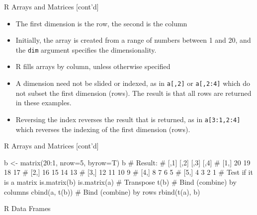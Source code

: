 \documentclass[ignorenonframetext,xcolor=x11names]{beamer}
\begin{document}
\begin{frame}[label=full]{R Arrays and Matrices \small [cont'd]}
\begin{itemize}
   \item The first dimension is the row, the second is the column
   \item Initially, the array is created from a range of numbers between 1 and 20, and the \texttt{dim} argument specifies the dimensionality. 
   \item R fills arrays by column, unless otherwise specified
   \item A dimension need not be slided or indexed, as in \texttt{a[,2]} or \texttt{a[,2:4]} which do not subset the first dimension (rows). The result is that all rows are returned in these examples. 
   \item Reversing the index reverses the result that is returned, as in \texttt{a[3:1,2:4]} which reverses the indexing of the first dimension (rows). 
\end{itemize}
\end{frame}

\begin{frame}[label=full,fragile]{R Arrays and Matrices \small [cont'd]}
\begin{Rcode}
b <- matrix(20:1, nrow=5, byrow=T)
b
# Result:
#      [,1] [,2] [,3] [,4]
# [1,]   20   19   18   17
# [2,]   16   15   14   13
# [3,]   12   11   10    9
# [4,]    8    7    6    5
# [5,]    4    3    2    1
# Test if it is a matrix
is.matrix(b)
is.matrix(a)
# Transpose
t(b)
# Bind (combine) by columns
cbind(a, t(b))
# Bind (combine) by rows
rbind(t(a), b)
\end{Rcode}
\end{frame}



\begin{frame}[label=full,fragile]{R Data Frames}
\end{frame}
\end{document}
